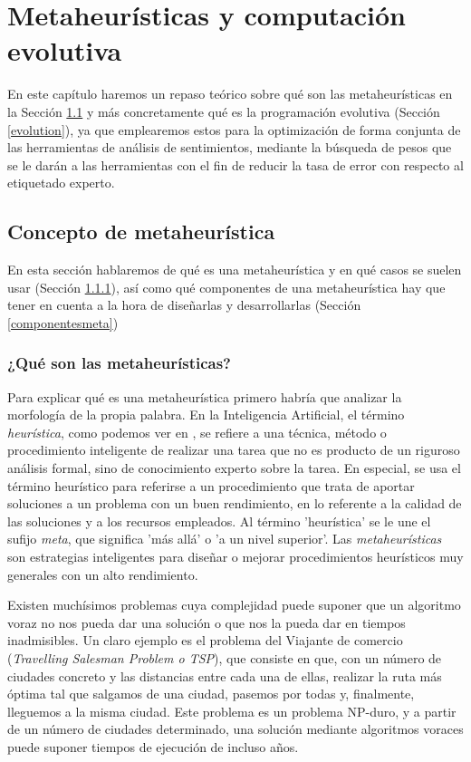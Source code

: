 \chapter{Metaheurísticas y computación evolutiva}
En este capítulo haremos un repaso teórico sobre qué son las metaheurísticas en la Sección \ref{meta} y más concretamente qué es la programación evolutiva (Sección \ref{evolution}), ya que emplearemos estos para la optimización de forma conjunta de las herramientas de análisis de sentimientos, mediante la búsqueda de pesos que se le darán a las herramientas con el fin de reducir la tasa de error con respecto al etiquetado experto.

\section{Concepto de metaheurística} \label{meta}
En esta sección hablaremos de qué es una metaheurística y en qué casos se suelen usar (Sección \ref{conceptmeta}), así como qué componentes de una metaheurística hay que tener en cuenta a la hora de diseñarlas y desarrollarlas (Sección \ref{componentesmeta})

\subsection{¿Qué son las metaheurísticas?} \label{conceptmeta}
Para explicar qué es una metaheurística primero habría que analizar la morfología de la propia palabra. En la Inteligencia Artificial, el término \textit{heurística}, como podemos ver en \cite{meta}, se refiere a una técnica, método o procedimiento inteligente de realizar una tarea que no es producto de un riguroso análisis formal, sino de conocimiento experto sobre la tarea.  En especial, se usa el término heurístico para referirse a un procedimiento que trata de aportar soluciones a un problema con un buen rendimiento, en lo referente a la calidad de las soluciones y a los recursos empleados. Al término 'heurística' se le une el sufijo \textit{meta}, que significa 'más allá' o 'a un nivel superior'. Las \textit{metaheurísticas} son estrategias inteligentes para diseñar o mejorar procedimientos heurísticos muy generales con un alto rendimiento.

Existen muchísimos problemas cuya complejidad puede suponer que un algoritmo voraz no nos pueda dar una solución o que nos la pueda dar en tiempos inadmisibles. Un claro ejemplo es el problema del Viajante de comercio (\textit{Travelling Salesman Problem o TSP}), que consiste en que, con un número de ciudades concreto y las distancias entre cada una de ellas, realizar la ruta más óptima tal que salgamos de una ciudad, pasemos por todas y, finalmente, lleguemos a la misma ciudad. Este problema es un problema NP-duro, y a partir de un número de ciudades determinado, una solución mediante algoritmos voraces puede suponer tiempos de ejecución de incluso años.


